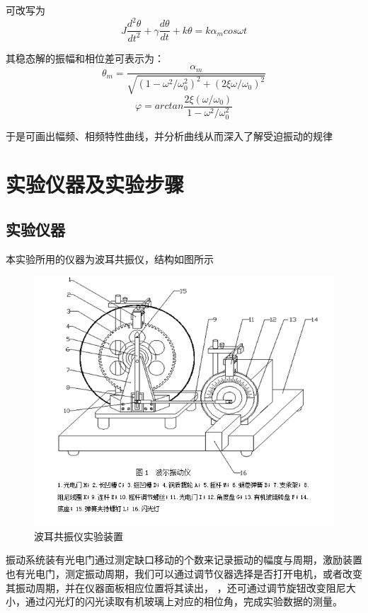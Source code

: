 \documentclass[UTF8]{ctexart}
\begin{document}
            可改写为
            $$J\frac{d^{2}\theta}{dt^{2}}+\gamma\frac{d\theta}{dt}+k\theta=k\alpha_{m}cos\omega t$$

            其稳态解的振幅和相位差可表示为：
            $$\theta_{m}=\frac{\alpha_{m}}{\sqrt{(1-\omega^{2}/\omega_{0}^{2})^{2}+(2\xi\omega/\omega_{0})^{2}}}$$
            $$\varphi=arctan\frac{2\xi(\omega/\omega_{0})}{1-\omega^{2}/\omega_{0}^{2}}$$

            于是可画出幅频、相频特性曲线，并分析曲线从而深入了解受迫振动的规律
    \newpage
    \section{实验仪器及实验步骤}
        \subsection{实验仪器}
            本实验所用的仪器为波耳共振仪，结构如图所示
            \begin{figure}[ht]
                \centering
                \includegraphics[scale=0.4]{device.png}
                \caption{波耳共振仪实验装置}
            \end{figure}

            振动系统装有光电门通过测定缺口移动的个数来记录振动的幅度与周期，激励装置也有光电门，测定振动周期，我们可以通过调节仪器选择是否打开电机，或者改变其振动周期，并在仪器面板相应位置将其读出，
            ，还可通过调节旋钮改变阻尼大小，通过闪光灯的闪光读取有机玻璃上对应的相位角，完成实验数据的测量。
\end{document}
